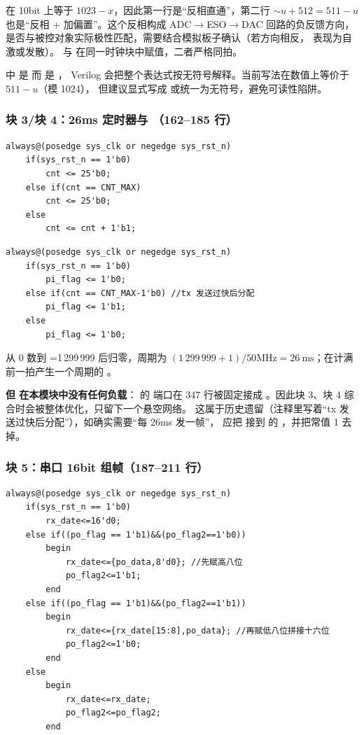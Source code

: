  在 10bit 上等于 $1023-x$，因此第一行是“反相直通”，第二行
$\sim u+512 = 511-u$ 也是“反相 + 加偏置”。这个反相构成 ADC$\rightarrow$ESO$\rightarrow$DAC
回路的负反馈方向，是否与被控对象实际极性匹配，需要结合模拟板子确认（若方向相反，
表现为自激或发散）。 与  在同一时钟块中赋值，二者严格同拍。

\begin{warnbox}
 中  是  而  是 ，
Verilog 会把整个表达式按无符号解释。当前写法在数值上等价于 $511-u$（模 1024），
但建议显式写成  或统一为无符号，避免可读性陷阱。
\end{warnbox}

\subsubsection{块 3/块 4：26ms 定时器与 （162--185 行）}

\begin{lstlisting}[style=vsnip]
always@(posedge sys_clk or negedge sys_rst_n)
    if(sys_rst_n == 1'b0)
        cnt <= 25'b0;
    else if(cnt == CNT_MAX)
        cnt <= 25'b0;
    else
        cnt <= cnt + 1'b1;
\end{lstlisting}

\begin{lstlisting}[style=vsnip]
always@(posedge sys_clk or negedge sys_rst_n)
    if(sys_rst_n == 1'b0)
        pi_flag <= 1'b0;
    else if(cnt == CNT_MAX-1'b0) //tx 发送过快后分配
        pi_flag <= 1'b1;
    else
        pi_flag <= 1'b0;
\end{lstlisting}

 从 0 数到 =1\,299\,999 后归零，周期为
$(1\,299\,999+1)/50\text{MHz}=26\ \text{ms}$；在计满前一拍产生一个周期的 。

\textbf{但  在本模块中没有任何负载}： 的  端口在
347 行被固定接成 。因此块 3、块 4 综合时会被整体优化，只留下一个悬空网络。
这属于历史遗留（注释里写着“tx 发送过快后分配”），如确实需要“每 26ms 发一帧”，
应把  接到  的 ，并把常值 1 去掉。

\subsubsection{块 5：串口 16bit 组帧（187--211 行）}

\begin{lstlisting}[style=vsnip]
always@(posedge sys_clk or negedge sys_rst_n)
    if(sys_rst_n == 1'b0)
        rx_date<=16'd0;
    else if((po_flag == 1'b1)&&(po_flag2==1'b0))
        begin
            rx_date<={po_data,8'd0}; //先赋高八位
            po_flag2<=1'b1;
        end
    else if((po_flag == 1'b1)&&(po_flag2==1'b1))
        begin
            rx_date<={rx_date[15:8],po_data}; //再赋低八位拼接十六位
            po_flag2<=1'b0;
        end
    else
        begin
            rx_date<=rx_date;
            po_flag2<=po_flag2;
        end
\end{lstlisting}


